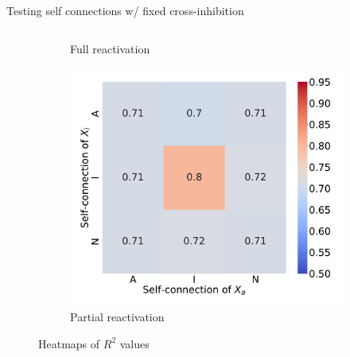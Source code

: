 \documentclass[aspectratio=169,9pt]{beamer}
\begin{document}
\begin{frame}{Testing self connections w/ fixed cross-inhibition}
\begin{columns}
\begin{column}{0.75\textwidth}
\begin{figure}[h]
\begin{subfigure}[b]{0.49\textwidth}
                            \caption{Full reactivation}
                        \end{subfigure}
                        \pause
                        \begin{subfigure}[b]{0.49\textwidth}
                            \centering
                            \includegraphics[width=\textwidth]{vary_self-Partial_timeshifted-rsq-hmap}
                            \caption{Partial reactivation}
                        \end{subfigure}
                    \pause[2]\caption{Heatmaps of $R^2$ values}
                \end{figure}
            \end{column}
        \end{columns}
    \end{frame}
\end{document}
